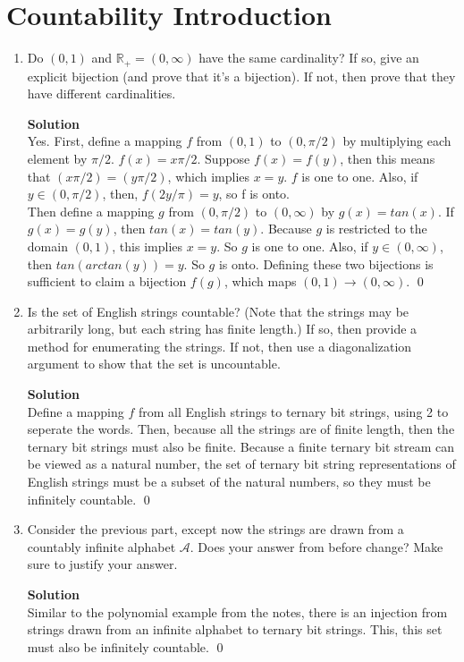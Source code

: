 \documentclass[11pt]{article}
\newcommand*{\Question}[1]{\section{#1}}
\newenvironment{Parts}{\begin{enumerate}[label=(\alph*)]}{\end{enumerate}}
\newcommand*{\Part}{\item}
\newcommand*{\R}{\mathbb{R}}
\begin{document}
\Question{Countability Introduction}

\begin{Parts}
    \Part Do $(0, 1)$ and $\R_+ = (0, \infty)$ have the same cardinality? If so, give an explicit bijection (and prove that it's a bijection). If not, then prove that they have different cardinalities.
\begin{mdframed} \textbf{Solution} \\
Yes. First, define a mapping $f$ from $(0,1)$ to $(0,\pi/2)$ by multiplying each element by $\pi/2$. $f(x)=x\pi/2$. Suppose $f(x)=f(y)$, then this means that $(x\pi/2)=(y\pi/2)$, which implies $x=y$. $f$ is one to one. Also, if $y \in (0,\pi/2)$, then, $f(2y/\pi)=y$, so f is onto. \\
Then define a mapping $g$ from $(0,\pi/2)$ to $(0,\infty)$ by $g(x)=tan(x)$. If $g(x)=g(y)$, then $tan(x)=tan(y)$. Because $g$ is restricted to the domain $(0,1)$, this implies $x=y$. So $g$ is one to one. Also, if $y \in (0,\infty)$, then $tan(arctan(y))=y$. So $g$ is onto. Defining these two bijections is sufficient to claim a bijection $f(g)$, which maps $(0,1) \rightarrow (0,\infty)$. \qed
\end{mdframed}

    \Part Is the set of English strings countable? (Note that the strings may be arbitrarily long, but each string has finite length.) If so, then provide a method for enumerating the strings. If not, then use a diagonalization argument to show that the set is uncountable.
\begin{mdframed} \textbf{Solution} \\
Define a mapping $f$ from all English strings to ternary bit strings, using 2 to seperate the words. Then, because all the strings are of finite length, then the ternary bit strings must also be finite. Because a finite ternary bit stream can be viewed as a natural number, the set of ternary bit string representations of English strings must be a subset of the natural numbers, so they must be infinitely countable. \qed
\end{mdframed}

    \Part Consider the previous part, except now the strings are drawn from a countably infinite alphabet $\mathcal{A}$. Does your answer from before change? Make sure to justify your answer.
\begin{mdframed} \textbf{Solution} \\
Similar to the polynomial example from the notes, there is an injection from strings drawn from an infinite alphabet to ternary bit strings. This, this set must also be infinitely countable. \qed
\end{mdframed}
\end{Parts}

\end{document}
